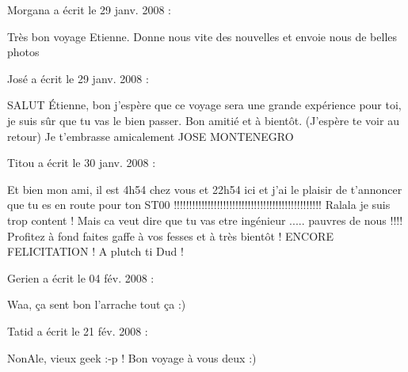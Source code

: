  \medskip
Morgana a écrit le 29 janv. 2008 :
\begin{displayquote}
Très bon voyage Etienne. Donne nous vite des nouvelles et envoie nous de belles photos
\end{displayquote}

 \medskip
José a écrit le 29 janv. 2008 :
\begin{displayquote}
SALUT Étienne, bon j'espère que ce voyage sera une grande expérience pour toi, je suis sûr que tu vas le bien passer.
 Bon amitié et à bientôt. (J'espère te voir au retour)
 Je t'embrasse amicalement JOSE MONTENEGRO
\end{displayquote}

 \medskip
Titou a écrit le 30 janv. 2008 :
\begin{displayquote}
Et bien mon ami, il est 4h54 chez vous et 22h54 ici et j'ai le plaisir de t'annoncer que tu es en route pour ton ST00 !!!!!!!!!!!!!!!!!!!!!!!!!!!!!!!!!!!!!!!!!!!!!!!! Ralala je suis trop content ! Mais ca veut dire que tu vas etre ingénieur ..... pauvres de nous !!!! Profitez à fond faites gaffe à vos fesses et à très bientôt ! ENCORE FELICITATION ! A plutch ti Dud !
\end{displayquote}

 \medskip
Gerien a écrit le 04 fév. 2008 :
\begin{displayquote}
Waa, ça sent bon l'arrache tout ça :)
\end{displayquote}

 \medskip
Tatid a écrit le 21 fév. 2008 :
\begin{displayquote}
NonAle, vieux geek :-p !
Bon voyage à vous deux :)
\end{displayquote}

